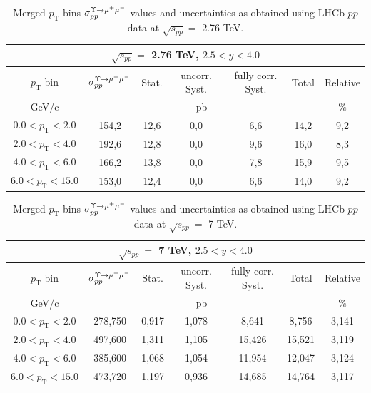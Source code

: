 \begin{table}[htp]
\begin{center}
\begin{tabular}{|c||c|c|c|c|c|c|}
  \hline
  \multicolumn{7}{|c|}{$\sqrt{s_{pp}}=$ 2.76 TeV, $2.5<y<4.0$}\\
  \hline
  $p_\mathrm{T}$ bin & $\sigma_{pp}^{\Upsilon\rightarrow \mu^{+}\mu^{\--}} $ & Stat. & uncorr. Syst. & fully corr. Syst. & Total & Relative \\
  \hline
  GeV/c & \multicolumn{5}{c|}{pb} & $\%$ \\
  \hline
  $0.0 < p_\mathrm{T} < 2.0 $ & 154,2 & 12,6 & 0,0 & 6,6 & 14,2 & 9,2 \\
  \hline
  $2.0 < p_\mathrm{T} < 4.0 $& 192,6 & 12,8 & 0,0	 & 9,6 & 16,0 & 8,3\\
  \hline
  $4.0 < p_\mathrm{T} < 6.0 $& 166,2 & 13,8 & 0,0	 & 7,8 & 15,9 & 9,5\\
  \hline
  $6.0 < p_\mathrm{T} < 15.0 $& 153,0 & 12,4	 & 0,0 & 6,6 & 14,0 & 9,2\\
  \hline
\end{tabular}
\caption{Merged $p_\mathrm{T}$ bins $\sigma_{pp}^{\Upsilon\rightarrow \mu^{+}\mu^{\--}} $ values and uncertainties as obtained using LHCb $pp$ data at $\sqrt{s_{pp}}=$ 2.76 TeV.}\label{table:LHCbData276}
\end{center}
\end{table}

\begin{table}[htp]
\begin{center}
\begin{tabular}{|c||c|c|c|c|c|c|}
  \hline
  \multicolumn{7}{|c|}{$\sqrt{s_{pp}}=$ 7 TeV, $2.5<y<4.0$}\\
  \hline
  $p_\mathrm{T}$ bin & $\sigma_{pp}^{\Upsilon\rightarrow \mu^{+}\mu^{\--}} $ & Stat. & uncorr. Syst. & fully corr. Syst. & Total & Relative \\
  \hline
  GeV/c & \multicolumn{5}{c|}{pb} & $\%$ \\
  \hline
  $0.0 < p_\mathrm{T} < 2.0 $ & 278,750 & 0,917 & 1,078 & 8,641 & 8,756 & 3,141 \\
  \hline
  $2.0 < p_\mathrm{T} < 4.0 $& 497,600 & 1,311 & 1,105 & 15,426 & 15,521 & 3,119 \\
  \hline
  $4.0 < p_\mathrm{T} < 6.0 $& 385,600 & 1,068 & 1,054 & 11,954 & 12,047 & 3,124 \\
  \hline
  $6.0 < p_\mathrm{T} < 15.0 $& 473,720 & 1,197 & 0,936 & 14,685 & 14,764 & 3,117 \\
  \hline
\end{tabular}
\caption{Merged $p_\mathrm{T}$ bins $\sigma_{pp}^{\Upsilon\rightarrow \mu^{+}\mu^{\--}} $ values and uncertainties as obtained using LHCb $pp$ data at $\sqrt{s_{pp}}=$ 7 TeV.}\label{table:LHCbData7}
\end{center}
\end{table}

